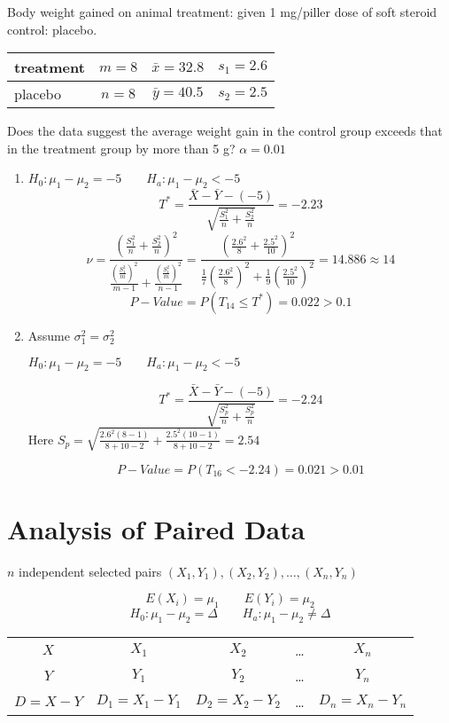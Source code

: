 \begin{exmp}
Body weight gained on animal treatment: given 1 mg/piller dose of soft steroid control: placebo.
\begin{center}
\begin{tabular}{l|c|c|c}
\hline
treatment & $m=8$ & $\bar{x}=32.8$ & $s_1=2.6$ \\
\hline
placebo & $n=8$ & $\bar{y}=40.5$ & $s_2=2.5$ \\
\hline
\end{tabular}
\end{center}

Does the data suggest the average weight gain in the control group exceeds that in the treatment group by more than 5 g? $\alpha = 0.01$

\begin{enumerate}
\item $H_0:\mu_1-\mu_2 = -5 \qquad H_a:\mu_1-\mu_2 < -5$
\[T^*=\frac{\bar{X}-\bar{Y}-(-5)}{\sqrt{\frac{S_1^2}{n}+\frac{S_2^2}{n}}}=-2.23 \]
\[\nu=\frac{\left( \frac{S_1^2}{n}+\frac{S_2^2}{n} \right)^2}{ \frac{\left( \frac{S_1^2}{m} \right)^2}{m-1}+ \frac{\left( \frac{S_1^2}{m} \right)^2}{n-1}  }=\frac{\left(\frac{2.6^2}{8}+\frac{2.5^2}{10}\right)^2}{\frac{1}{7} \left(\frac{2.6^2}{8}\right)^2+\frac{1}{9} \left(\frac{2.5^2}{10}\right)^2}=14.886 \approx 14\]
\[P-Value=P(T_{14}\leq T^*)=0.022>0.1\]
\item Assume $\sigma_1^2=\sigma_2^2$

$H_0:\mu_1-\mu_2 = -5 \qquad H_a:\mu_1-\mu_2 < -5$

\[T^*=\frac{\bar{X}-\bar{Y}-(-5)}{\sqrt{\frac{S_p^2}{n}+\frac{S_p^2}{n}}}=-2.24\]
Here $S_p=\sqrt{\frac{2.6^2 (8-1)}{8+10-2}+\frac{2.5^2 (10-1)}{8+10-2}}=2.54$

\[P-Value=P(T_{16}<-2.24)=0.021>0.01\]

\end{enumerate}
\end{exmp}

\section{Analysis of Paired Data}
$n$ independent selected pairs
$(X_1,Y_1),(X_2,Y_2),\dots,(X_n,Y_n)$

\[E(X_i)=\mu_1 \qquad E(Y_i)=\mu_2\]
\[H_0:\mu_1-\mu_2=\Delta \qquad H_a:\mu_1-\mu_2 \neq\Delta\]
\begin{center}
\begin{tabular}{ccccc}
\hline
$X$ & $X_1$ & $X_2$ & \dots & $X_n$ \\ 
$Y$ & $Y_1$ & $Y_2$ & \dots & $Y_n$ \\ 
$D=X-Y$ & $D_1=X_1-Y_1$ & $D_2=X_2-Y_2$ & \dots & $D_n=X_n-Y_n$ \\
\hline
\end{tabular}
\end{center}


